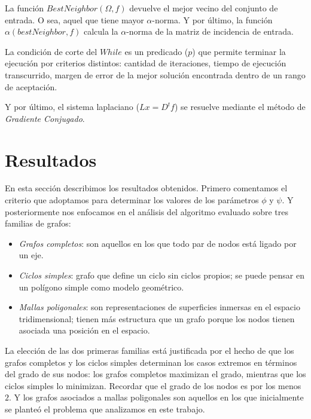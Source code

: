 \documentclass[conference,compsoc,a4paper]{IEEEtran}
\begin{document}
\smallskip

La función $BestNeighbor(\Omega,f)$ devuelve el mejor vecino del conjunto 
de entrada. O sea, aquel que tiene mayor $\alpha$-norma. Y por último, 
la función $\alpha(bestNeighbor,f)$ calcula la $\alpha$-norma de la matriz 
de incidencia de entrada.

\smallskip

La condición de corte del $While$ es un predicado ($p$) que permite 
terminar la ejecución por criterios distintos: cantidad de iteraciones, 
tiempo de ejecución transcurrido, margen de error de la mejor solución 
encontrada dentro de un rango de aceptación.

\smallskip

Y por último, el sistema laplaciano ($Lx = D^t f$) se resuelve mediante 
el método de \emph{Gradiente Conjugado}.

\section{Resultados}

En esta sección describimos los resultados obtenidos. Primero 
comentamos el criterio que adoptamos para determinar los valores de los 
parámetros $\phi$ y $\psi$. Y posteriormente nos enfocamos en el 
análisis del algoritmo evaluado sobre tres familias de grafos: 

\begin{itemize}
	\item \emph{Grafos completos}: son aquellos en los que todo par de  
	nodos está ligado por un eje.
	\item \emph{Ciclos simples}: grafo que define un ciclo sin ciclos 
	propios; se puede pensar en un polígono simple como modelo 
	geométrico.
	\item \emph{Mallas poligonales}: son representaciones de superficies 
	inmersas en el espacio tridimensional; tienen más estructura que un 
	grafo porque los nodos tienen asociada una posición en el espacio.
\end{itemize}

La elección de las dos primeras familias está justificada por el hecho 
de que los grafos completos y los ciclos simples determinan los casos 
extremos en términos del grado de sus nodos: los grafos completos 
maximizan el grado, mientras que los ciclos simples lo minimizan. 
Recordar que el grado de los nodos es por los menos $2$. Y los grafos 
asociados a mallas poligonales son aquellos en los que inicialmente se planteó 
el problema que analizamos en este trabajo.
\end{document}
